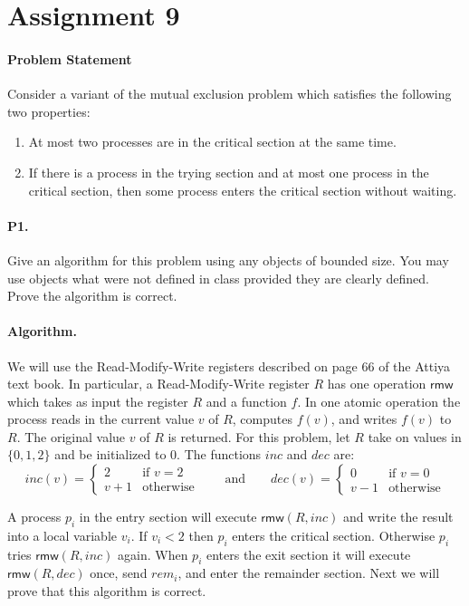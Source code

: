 \documentclass[11pt]{article}
\newcommand\rmw{\mathsf{rmw}}
\begin{document}
\rhead{\today}

\section*{Assignment 9}
\paragraph{Problem Statement}
Consider a variant of the mutual exclusion problem which satisfies the following two properties:
\begin{enumerate}
\item At most two processes are in the critical section at the same time.
\item If there is a process in the trying section and at most one process in the critical section, then some process enters the critical section without waiting.
\end{enumerate}

\paragraph{P1.} Give an algorithm for this problem using any objects of bounded size. You may use objects what were not defined in class provided they are clearly defined. Prove the algorithm is correct. 
\paragraph{Algorithm.} We will use the Read-Modify-Write registers described on page 66 of the Attiya text book. In particular, a Read-Modify-Write register $R$ has one operation $\rmw$ which takes as input the register $R$ and a function $f$. In one atomic operation the process reads in the current value $v$ of $R$, computes $f(v)$, and writes $f(v)$ to $R$. The original value $v$ of $R$ is returned. For this problem, let $R$ take on values in $\{0,1,2\}$ and be initialized to $0$. The functions $inc$ and $dec$ are:
\[inc(v) = \begin{cases}
2 &\mbox{if } v = 2\\
v+1 &\mbox{otherwise}
\end{cases} \qquad\mbox{and}\qquad 
dec(v) = \begin{cases}
0 &\mbox{if } v = 0\\
v-1 &\mbox{otherwise}
\end{cases}\] 

A process $p_i$ in the entry section will execute $\rmw(R, inc)$ and write the result into a local variable $v_i$. If $v_i < 2$ then $p_i$ enters the critical section. Otherwise $p_i$ tries $\rmw(R, inc)$ again. When $p_i$ enters the exit section it will execute $\rmw(R, dec)$ once, send $rem_i$, and enter the remainder section. Next we will prove that this algorithm is correct.
\end{document}
